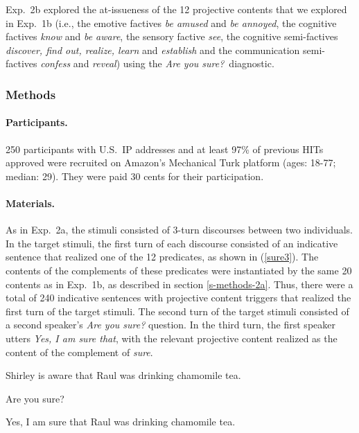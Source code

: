 \documentclass[11pt,fleqn]{article}
\newcommand{\6}{\mbox{$[\hspace*{-.6mm}[$}}
\newcommand{\9}{\mbox{$]\hspace*{-.6mm}]$}}
\begin{document}
Exp.~2b explored the at-issueness of the 12 projective contents that we explored in Exp.~1b (i.e., the emotive factives {\em be amused} and {\em be annoyed}, the cognitive factives {\em know} and {\em be aware}, the sensory factive {\em see}, the cognitive semi-factives {\em discover, find out, realize, learn} and {\em establish} and the communication semi-factives {\em confess} and {\em reveal}) using the {\em Are you sure?}~diagnostic.

\subsubsection{Methods}

\paragraph{Participants.} 250 participants with U.S.\ IP addresses and at least 97\% of previous HITs approved were recruited on Amazon's Mechanical Turk platform (ages: 18-77; median: 29). They were paid 30 cents for their participation.

\paragraph{Materials.} As in Exp.~2a, the stimuli consisted of 3-turn discourses between two individuals. In the target stimuli, the first turn of each discourse consisted of an indicative sentence that realized one of the 12 predicates, as shown in (\ref{sure3}). The contents of the complements of these predicates were instantiated by the same 20 contents as in Exp.~1b, as described in section \ref{s-methods-2a}. Thus, there were a total of 240 indicative sentences with projective content triggers that realized the first turn of the target stimuli. The second turn of the target stimuli consisted of a second speaker's {\em Are you sure?} question. In the third turn, the first speaker utters {\em Yes, I am sure that}, with the relevant projective content realized as the content of the complement of {\em sure}. 

\begin{exe}
\ex\label{sure3}
\begin{xlist}
 Shirley is aware that Raul was drinking chamomile tea.

 Are you sure?

 Yes, I am sure that Raul was drinking chamomile tea.
\end{xlist}
\end{exe}
\end{document}
